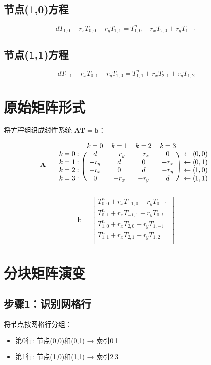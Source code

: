 \documentclass[UTF8]{ctexart}
\begin{document}
\subsection{节点(1,0)方程}
$$
d T_{1,0} - r_x T_{0,0} - r_y T_{1,1} = T_{1,0}^n + r_x T_{2,0} + r_y T_{1,-1}
$$

\subsection{节点(1,1)方程}
$$
d T_{1,1} - r_x T_{0,1} - r_y T_{1,0} = T_{1,1}^n + r_x T_{2,1} + r_y T_{1,2}
$$

\section{原始矩阵形式}
将方程组织成线性系统 $\mathbf{A}\mathbf{T} = \mathbf{b}$：

$$
\mathbf{A} =
\begin{blockarray}{cccccc}
& k=0 & k=1 & k=2 & k=3 \\
\begin{block}{c(cccc)c}
k=0: & d & -r_y & -r_x & 0 & \leftarrow (0,0) \\
k=1: & -r_y & d & 0 & -r_x & \leftarrow (0,1) \\
k=2: & -r_x & 0 & d & -r_y & \leftarrow (1,0) \\
k=3: & 0 & -r_x & -r_y & d & \leftarrow (1,1) \\
\end{block}
\end{blockarray}
$$

$$
\mathbf{b} =
\begin{bmatrix}
T_{0,0}^n + r_x T_{-1,0} + r_y T_{0,-1} \\
T_{0,1}^n + r_x T_{-1,1} + r_y T_{0,2} \\
T_{1,0}^n + r_x T_{2,0} + r_y T_{1,-1} \\
T_{1,1}^n + r_x T_{2,1} + r_y T_{1,2} \\
\end{bmatrix}
$$

\section{分块矩阵演变}

\subsection{步骤1：识别网格行}
将节点按网格行分组：
\begin{itemize}
\item 第0行: 节点(0,0)和(0,1) → 索引0,1
\item 第1行: 节点(1,0)和(1,1) → 索引2,3
\end{itemize}
\end{document}
